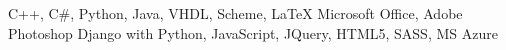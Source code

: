 \vspace{\acvSectionContentTopSkip}
\vspace{\acvSectionContentTopSkip}
\begin{cvskills}
	 {C++, C\#, Python, Java, VHDL, Scheme, LaTeX}
	 {Microsoft Office, Adobe Photoshop}
	 {Django with Python, JavaScript, JQuery, HTML5, SASS, MS	Azure}
  \end{cvskills}

